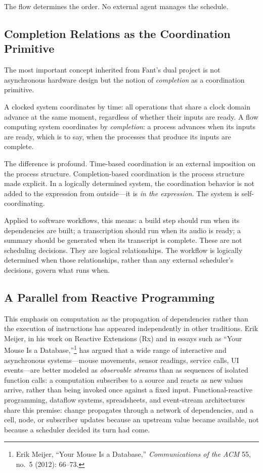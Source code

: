 \documentclass[12pt, a4paper]{article}
\begin{document}
The flow determines the order. No external agent manages the schedule.

\subsection{Completion Relations as the Coordination Primitive}

The most important concept inherited from Fant's dual project is not
asynchronous hardware design but the notion of \emph{completion} as
a coordination primitive.

A clocked system coordinates by time: all operations that share a
clock domain advance at the same moment, regardless of whether their
inputs are ready. A flow computing system coordinates by
\emph{completion}: a process advances when its inputs are ready,
which is to say, when the processes that produce its inputs are
complete.

The difference is profound. Time-based coordination is an external
imposition on the process structure. Completion-based coordination
is the process structure made explicit. In a logically determined
system, the coordination behavior is not added to the expression from
outside---it is \emph{in the expression}. The system is self-
coordinating.

Applied to software workflows, this means: a build step should run
when its dependencies are built; a transcription should run when its
audio is ready; a summary should be generated when its transcript is
complete. These are not scheduling decisions. They are logical
relationships. The workflow is logically determined when those
relationships, rather than any external scheduler's decisions, govern
what runs when.

\subsection{A Parallel from Reactive Programming}

This emphasis on computation as the propagation of dependencies
rather than the execution of instructions has appeared
independently in other traditions. Erik Meijer, in his work on
Reactive Extensions (Rx) and in essays such as ``Your Mouse Is a
Database,''\footnote{Erik Meijer, ``Your Mouse Is a Database,''
\textit{Communications of the ACM} 55, no.\ 5 (2012): 66--73.} has
argued that a wide range of interactive and asynchronous
systems---mouse movements, sensor readings, service calls, UI
events---are better modeled as \emph{observable streams} than as
sequences of isolated function calls: a computation subscribes to
a source and reacts as new values arrive, rather than being
invoked once against a fixed input. Functional-reactive
programming, dataflow systems, spreadsheets, and event-stream
architectures share this premise: change propagates through a
network of dependencies, and a cell, node, or subscriber updates
because an upstream value became available, not because a
scheduler decided its turn had come.
\end{document}
